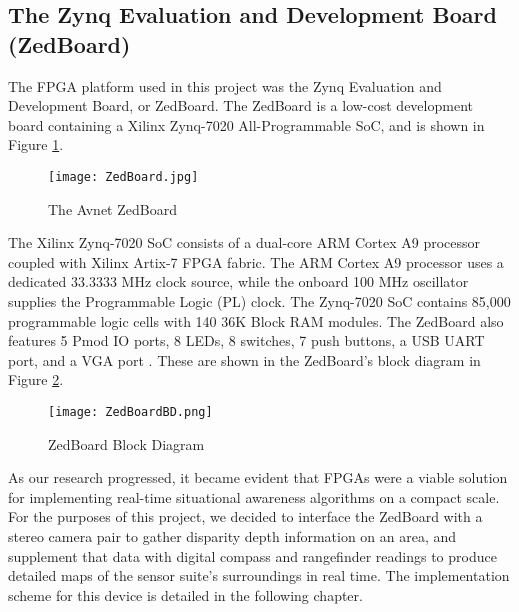 \subsection{The Zynq Evaluation and Development Board (ZedBoard)}
The FPGA platform used in this project was the Zynq Evaluation and Development Board, or ZedBoard. The ZedBoard is a low-cost development board containing a Xilinx Zynq-7020 All-Programmable SoC, and is shown in Figure \ref{zedboard_pic}.

\begin{figure}[H]
	\centerline{\texttt{[image: ZedBoard.jpg]}}
	\caption{The Avnet ZedBoard \cite{zedboard_photo}}
	\label{zedboard_pic}
\end{figure}

The Xilinx Zynq-7020 SoC consists of a dual-core ARM Cortex A9 processor coupled with Xilinx Artix-7 FPGA fabric. The ARM Cortex A9 processor uses a dedicated 33.3333 MHz clock source, while the onboard 100 MHz oscillator supplies the Programmable Logic (PL) clock. The Zynq-7020 SoC contains 85,000 programmable logic cells with 140 36K Block RAM modules. The ZedBoard also features 5 Pmod IO ports, 8 LEDs, 8 switches, 7 push buttons, a USB UART port, and a VGA port \cite{zedboard_datasheet}. These are shown in the ZedBoard's block diagram in Figure \ref{zedboardbd}.

\begin{figure}[H]
	\centerline{\texttt{[image: ZedBoardBD.png]}}
	\caption{ZedBoard Block Diagram \cite{zedboard_datasheet}}
	\label{zedboardbd}
\end{figure}
\par
As our research progressed, it became evident that FPGAs were a viable solution for implementing real-time situational awareness algorithms on a compact scale. For the purposes of this project, we decided to interface the ZedBoard with a stereo camera pair to gather disparity depth information on an area, and supplement that data with digital compass and rangefinder readings to produce detailed maps of the sensor suite's surroundings in real time. The implementation scheme for this device is detailed in the following chapter.






